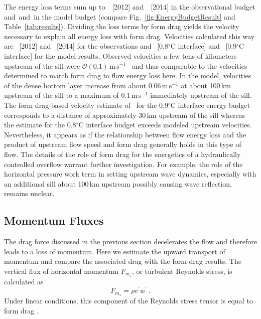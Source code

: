 \documentclass{ametsocV6.1}
\begin{document}
The energy loss terms sum up to \TyALossTerms\,\TyALossTermsUnit~[2012] and \TyBLossTerms\,\TyBLossTermsUnit~[2014] in the observational budget and \ModelLowerLossTerms\, and \ModelUpperLossTerms\, in the model budget (compare Fig.~\ref{fig:EnergyBudgetResult} and Table~\ref{tab:results}).
Dividing the loss terms by form drag yields the velocity necessary to explain all energy loss with form drag.
Velocities calculated this way are \TyAFormDragMatchVelocity\,\TyAFormDragMatchVelocityUnit{} [2012] and \TyBFormDragMatchVelocity\,\TyBFormDragMatchVelocityUnit{} [2014] for the observations and \ModelLowerFormDragMatchingVelocity\,\ModelLowerFormDragMatchingVelocityUnit{} [0.8$^{\circ}$C interface] and \ModelUpperFormDragMatchingVelocity\,\ModelUpperFormDragMatchingVelocityUnit{} [0.9$^{\circ}$C interface] for the model results.
Observed velocities a few tens of kilometers upstream of the sill were $\mathcal{O}(0.1)$\,m\,s$^{-1}$~\citep[][Fig.~2b]{alfordetal13c} and thus comparable to the velocities determined to match form drag to flow energy loss here.
In the model, velocities of the dense bottom layer increase from about 0.06\,m\,s$^{-1}$ at about 100\,km upstream of the sill to a maximum of 0.1\,m\,s$^{-1}$ immediately upstream of the sill.
The form drag-based velocity estimate of \ModelUpperFormDragMatchingVelocity\,\ModelUpperFormDragMatchingVelocityUnit{} for the 0.9$^{\circ}$C interface energy budget corresponds to a distance of approximately 30\,km upstream of the sill whereas the estimate for the 0.8$^{\circ}$C interface budget exceeds modeled upstream velocities.
Nevertheless, it appears as if the relationship between flow energy loss and the product of upstream flow speed and form drag generally holds in this type of flow.
The details of the role of form drag for the energetics of a hydraulically controlled overflow warrant further investigation.
For example, the role of the horizontal pressure work term in setting upstream wave dynamics, especially with an additional sill about 100\,km upstream possibly causing wave reflection, remains unclear.

\subsection{Momentum Fluxes}
\label{ssec:MomentumFluxes}
The drag force discussed in the previous section decelerates the flow and therefore leads to a loss of momentum.
Here we estimate the upward transport of momentum and compare the associated drag with the form drag results.
The vertical flux of horizontal momentum $F_{m_z}$, or turbulent Reynolds stress, is calculated as
\begin{equation}
    F_{m_z} = \rho v^\prime w^\prime\ .
\label{eq:MomentumFlux}
\end{equation}
Under linear conditions, this component of the Reynolds stress tensor is equal to form drag \citep[e.g.][]{gill82}.
\end{document}
